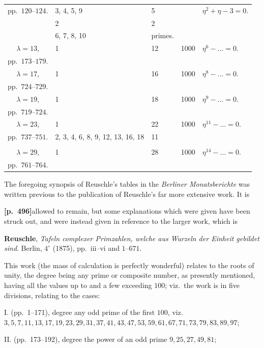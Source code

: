 \documentclass[11pt,a4paper]{article}
\begin{document}
\begin{center}
\begin{tabular}{|c|l|l|c|l|}
pp.~$120$--$124$. & 3, 4, 5, 9 & 5 & & $\eta^{2} + \eta - 3 = 0$. \\
 & 2 & 2 & & \\
 & 6, 7, 8, 10 & primes. & & \\
\hline
$\lambda = 13$, & 1 & 12 & 1000 & $\eta^{6} - \ldots = 0$. \\
pp.~$173$--$179$. & & & & \\
\hline
$\lambda = 17$, & 1 & 16 & 1000 & $\eta^{8} - \ldots = 0$. \\
pp.~$724$--$729$. & & & & \\
\hline
$\lambda = 19$, & 1 & 18 & 1000 & $\eta^{9} - \ldots = 0$. \\
pp.~$719$--$724$. & & & & \\
\hline
$\lambda = 23$, & 1 & 22 & 1000 & $\eta^{11} - \ldots = 0$. \\
pp.~$737$--$751$. & 2, 3, 4, 6, 8, 9, 12, 13, 16, 18 & 11 & & \\
 & & & & \\
\hline
$\lambda = 29$, & 1 & 28 & 1000 & $\eta^{14} - \ldots = 0$. \\
pp.~$761$--$764$. & & & & \\
\hline
\end{tabular}
\end{center}

The foregoing synopsis of Reuschle's tables in the \textit{Berliner Monatsberichte} was written previous to the publication of Reuschle's far more extensive work. It is

\noindent\textbf{[p.~496]}\quad allowed to remain, but some explanations which were given have been struck out, and were instead given in reference to the larger work, which is

\textbf{Reuschle}, \textit{Tafeln complexer Primzahlen, welche aus Wurzeln der Einheit gebildet sind}. Berlin, $4^{\circ}$ (1875), pp.~iii--vi and $1$--$671$.

This work (the mass of calculation is perfectly wonderful) relates to the roots of unity, the degree being any prime or composite number, as presently mentioned, having all the values up to and a few exceeding $100$; viz.\ the work is in five divisions, relating to the cases:

I. (pp.~1--171), degree any odd prime of the first $100$, viz.\ $3, 5, 7, 11, 13, 17, 19, 23, 29, 31, 37, 41, 43, 47, 53, 59, 61, 67, 71, 73, 79, 83, 89, 97$;

II. (pp.~173--192), degree the power of an odd prime $9, 25, 27, 49, 81$;
\end{document}
